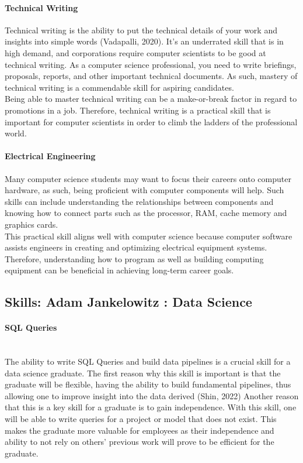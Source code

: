 \documentclass[a4paper, 11pt]{report}
\begin{document}
	\paragraph{Technical Writing} Technical writing is the ability to put the technical details of your work and insights into simple words (Vadapalli, 2020).  It’s an underrated skill that is in high demand, and corporations require computer scientists to be good at technical writing. As a computer science professional, you need to write briefings, proposals, reports, and other important technical documents. As such, mastery of technical writing is a commendable skill for aspiring candidates.
	\\ Being able to master technical writing can be a make-or-break factor in regard to promotions in a job. Therefore, technical writing is a practical skill that is important for computer scientists in order to climb the ladders of the professional world.

	\paragraph{Electrical Engineering} Many computer science students may want to focus their careers onto computer hardware, as such, being proficient with computer components will help. Such skills can include understanding the relationships between components and knowing how to connect parts such as the processor, RAM, cache memory and graphics cards.
	\\ This practical skill aligns well with computer science because computer software assists engineers in creating and optimizing electrical equipment systems. Therefore, understanding how to program as well as building computing equipment can be beneficial in achieving long-term career goals.



	\subsection{Skills: Adam Jankelowitz : Data Science}

	\paragraph{SQL Queries}
	\\The ability to write SQL Queries and build data pipelines is a crucial skill for a data science graduate. The first reason why this skill is important is that the graduate will be flexible, having the ability to build fundamental pipelines, thus allowing one to improve insight into the data derived (Shin, 2022) Another reason that this is a key skill for a graduate is to gain independence. With this skill, one will be able to write queries for a project or model that does not exist. This makes the graduate more valuable for employees as their independence and ability to not rely on others’ previous work will prove to be efficient for the graduate.
\end{document}
